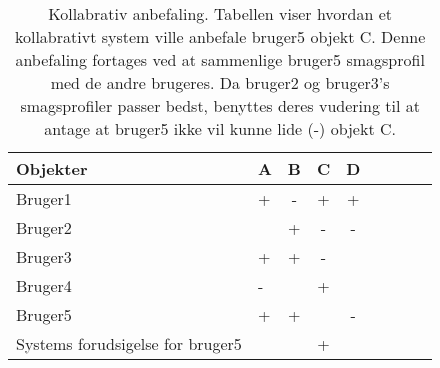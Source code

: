 \begin{table}[H]
  \centering
      \begin{tabular}{l|lccccccc}
      \textbf{Objekter}                 & A        & B       & C       & D  \\ \hline
      Bruger1                           & +        & -       & +       & +  \\
      Bruger2                           &          & +       & -       & -  \\
      Bruger3                           & +        & +       & -       &    \\
      Bruger4  		                      & -        &         & +       &    \\ \hline
      Bruger5  		                      & +        & +       &         & -  \\ \hline
      Systems forudsigelse for bruger5  &          &         & +       &    \\


    \end{tabular}
  \caption{Kollabrativ anbefaling. Tabellen viser hvordan et kollabrativt system ville anbefale bruger5 objekt C.
            Denne anbefaling fortages ved at sammenlige bruger5 smagsprofil med de andre brugeres.
            Da bruger2 og bruger3's smagsprofiler passer bedst, benyttes deres vudering til at antage at bruger5 ikke vil kunne lide (-) objekt C.
            \citep{kollabrativEksempel}}\label{tabel:kollabrativ}
\end{table}

